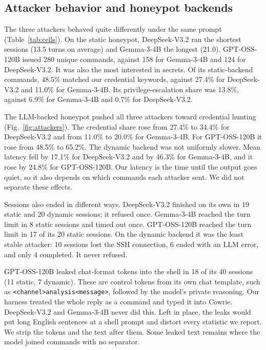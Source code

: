 \documentclass[conference]{IEEEtran}
\newcommand{\cmd}[1]{\texttt{#1}}
\begin{document}
\subsection{Attacker behavior and honeypot backends}\label{sec:behavior}

The three attackers behaved quite differently under the same prompt (Table~\ref{tab:cells}). On the static honeypot, DeepSeek-V3.2 ran the shortest sessions (13.5 turns on average) and Gemma-3-4B the longest (21.0). GPT-OSS-120B issued 280 unique commands, against 158 for Gemma-3-4B and 124 for DeepSeek-V3.2. It was also the most interested in secrets. Of its static-backend commands, 48.5\% matched our credential keywords, against 27.4\% for DeepSeek-V3.2 and 11.0\% for Gemma-3-4B. Its privilege-escalation share was 13.8\%, against 6.9\% for Gemma-3-4B and 0.7\% for DeepSeek-V3.2.

The LLM-backed honeypot pushed all three attackers toward credential hunting (Fig.~\ref{fig:attackers}). The credential share rose from 27.4\% to 34.4\% for DeepSeek-V3.2 and from 11.0\% to 20.0\% for Gemma-3-4B. For GPT-OSS-120B it rose from 48.5\% to 65.2\%. The dynamic backend was not uniformly slower. Mean latency fell by 17.1\% for DeepSeek-V3.2 and by 46.3\% for Gemma-3-4B, and it rose by 24.8\% for GPT-OSS-120B. Our latency is the time until the output goes quiet, so it also depends on which commands each attacker sent. We did not separate these effects.

Sessions also ended in different ways. DeepSeek-V3.2 finished on its own in 19 static and 20 dynamic sessions; it refused once. Gemma-3-4B reached the turn limit in 8 static sessions and timed out once. GPT-OSS-120B reached the turn limit in 17 of its 20 static sessions. On the dynamic backend it was the least stable attacker: 10 sessions lost the SSH connection, 6 ended with an LLM error, and only 4 completed. It never refused.

GPT-OSS-120B leaked chat-format tokens into the shell in 18 of its 40 sessions (11 static, 7 dynamic). These are control tokens from its own chat template, such as \cmd{\textless\textbar channel\textbar\textgreater analysis\textless\textbar message\textbar\textgreater}, followed by the model's private reasoning. Our harness treated the whole reply as a command and typed it into Cowrie. DeepSeek-V3.2 and Gemma-3-4B never did this. Left in place, the leaks would put long English sentences at a shell prompt and distort every statistic we report. We strip the tokens and the text after them. Some leaked text remains where the model joined commands with no separator.
\end{document}
